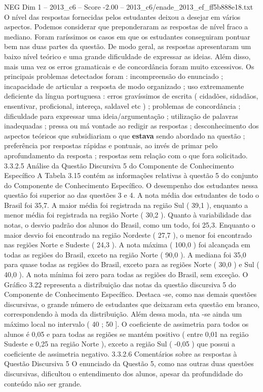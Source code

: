 \begin{textsample}{NEG Dim 1 – 2013\_c6 – Score -2.00 – 2013\_c6/enade\_2013\_ef\_ff5b888e18.txt}
O nível das respostas fornecidas pelos estudantes deixou a desejar em vários aspectos.
Podemos considerar que preponderaram as respostas de nível fraco a mediano.
Foram raríssimos os casos em que os estudantes conseguiram pontuar bem nas duas partes da questão.
De modo geral, as respostas apresentaram um baixo nível teórico e uma grande dificuldade de expressar as ideias.
Além disso, mais uma vez os erros gramaticais e de concordância foram muito excessivos.
Os principais problemas detectados foram : incompreensão do enunciado ; incapacidade de articular a resposta de modo organizado ; uso extremamente deficiente da língua portuguesa : erros gravíssimos de escrita ( cidadões, sidadãos, ensentivar, proficional, intereça, saldavel etc ) ; problemas de concordância ; dificuldade para expressar uma ideia/argumentação ; utilização de palavras inadequadas ; pressa ou má vontade ao redigir as respostas ; desconhecimento dos aspectos teóricos que subsidiariam o que \textbf{estava} sendo abordado na questão ; preferência por respostas rápidas e pontuais, ao invés de primar pelo aprofundamento da resposta ; respostas sem relação com o que fora solicitado. 3.3.2.5 Análise da Questão Discursiva 5 do Componente de Conhecimento Específico A Tabela 3.15 contém as informações relativas à questão 5 do conjunto do Componente de Conhecimento Específico.
O desempenho dos estudantes nessa questão foi superior ao das questões 3 e 4.
A nota média dos estudantes de todo o Brasil foi 35,7.
A maior média foi registrada na região Sul ( 39,1 ), enquanto a menor média foi registrada na região Norte ( 30,2 ).
Quanto à variabilidade das notas, o desvio padrão dos alunos do Brasil, como um todo, foi 25,3.
Enquanto o maior desvio foi encontrado na região Nordeste ( 27,7 ), o menor foi encontrado nas regiões Norte e Sudeste ( 24,3 ).
A nota máxima ( 100,0 ) foi alcançada em todas as regiões do Brasil, exceto na região Norte ( 90,0 ).
A mediana foi 35,0 para quase todas as regiões do Brasil, exceto para as regiões Norte ( 30,0 ) e Sul ( 40,0 ).
A nota mínima foi zero para todas as regiões do Brasil, sem exceção.
O Gráfico 3.22 representa a distribuição das notas da questão discursiva 5 do Componente de Conhecimento Específico.
Destaca -se, como nas demais questões discursivas, o grande número de estudantes que deixaram esta questão em branco, correspondendo à moda da distribuição.
Além dessa moda, nta -se ainda um máximo local no intervalo ( 40 ; 50 ].
O coeficiente de assimetria para todos os alunos é 0,05 e para todas as regiões se mantém positivo ( entre 0,01 na região Sudeste e 0,25 na região Norte ), exceto a região Sul ( -0,05 ) que possui a coeficiente de assimetria negativo. 3.3.2.6 Comentários sobre as respostas à Questão Discursiva 5 O enunciado da Questão 5, como nas outras duas questões discursivas, dificultou o entendimento dos alunos, apesar da profundidade do conteúdo não ser grande.

\end{textsample}
